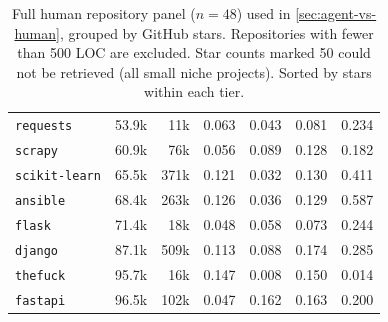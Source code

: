 \begin{table}[h]
\begin{tabular}{lrrcccc}
        \texttt{requests} & 53.9k & 11k & 0.063 & 0.043 & 0.081 & 0.234 \\
        \texttt{scrapy} & 60.9k & 76k & 0.056 & 0.089 & 0.128 & 0.182 \\
        \texttt{scikit-learn} & 65.5k & 371k & 0.121 & 0.032 & 0.130 & 0.411 \\
        \texttt{ansible} & 68.4k & 263k & 0.126 & 0.036 & 0.129 & 0.587 \\
        \texttt{flask} & 71.4k & 18k & 0.048 & 0.058 & 0.073 & 0.244 \\
        \texttt{django} & 87.1k & 509k & 0.113 & 0.088 & 0.174 & 0.285 \\
        \texttt{thefuck} & 95.7k & 16k & 0.147 & 0.008 & 0.150 & 0.014 \\
        \texttt{fastapi} & 96.5k & 102k & 0.047 & 0.162 & 0.163 & 0.200 \\
        \bottomrule
    \end{tabular}
    \caption{Full human repository panel ($n{=}48$) used in \autoref{sec:agent-vs-human}, grouped by GitHub stars. Repositories with fewer than 500 LOC are excluded. Star counts marked 50 could not be retrieved (all small niche projects). Sorted by stars within each tier.}
    \label{tab:human-repo-panel-full}
\end{table}
